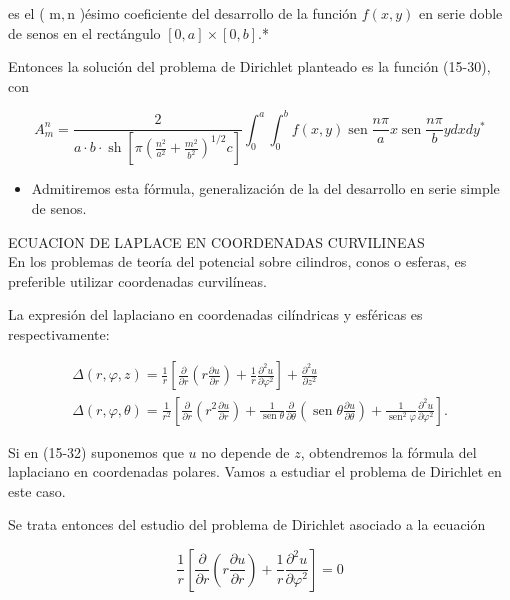 \documentclass[10pt]{article}
\theoremstyle{plain}
\theoremstyle{definition}
\theoremstyle{remark}
\begin{document}
es el ( $\mathrm{m}, \mathrm{n}$ )ésimo coeficiente del desarrollo de la función $f(x, y)$ en serie doble de senos en el rectángulo $[0, a] \times[0, b]$.*

Entonces la solución del problema de Dirichlet planteado es la función (15-30), con

$$
A_{m}^{n}=\frac{2}{a \cdot b \cdot \operatorname{sh}\left[\pi\left(\frac{n^{2}}{a^{2}}+\frac{m^{2}}{b^{2}}\right)^{1 / 2} c\right]} \int_{0}^{a} \int_{0}^{b} f(x, y) \operatorname{sen} \frac{n \pi}{a} x \operatorname{sen} \frac{n \pi}{b} y d x d y^{*}
$$

\begin{itemize}
  \item Admitiremos esta fórmula, generalización de la del desarrollo en serie simple de senos.
\end{itemize}

ECUACION DE LAPLACE EN COORDENADAS CURVILINEAS\\
En los problemas de teoría del potencial sobre cilindros, conos o esferas, es preferible utilizar coordenadas curvilíneas.

La expresión del laplaciano en coordenadas cilíndricas y esféricas es respectivamente:


\begin{gather*}
\Delta(r, \varphi, z)=\frac{1}{r}\left[\frac{\partial}{\partial r}\left(r \frac{\partial u}{\partial r}\right)+\frac{1}{r} \frac{\partial^{2} u}{\partial \varphi^{2}}\right]+\frac{\partial^{2} u}{\partial z^{2}}  \tag{15-32}\\
\Delta(r, \varphi, \theta)=\frac{1}{r^{2}}\left[\frac{\partial}{\partial r}\left(r^{2} \frac{\partial u}{\partial r}\right)+\frac{1}{\operatorname{sen} \theta} \frac{\partial}{\partial \theta}\left(\operatorname{sen} \theta \frac{\partial u}{\partial \theta}\right)+\frac{1}{\operatorname{sen}^{2} \varphi} \frac{\partial^{2} u}{\partial \varphi^{2}}\right] . \tag{15-33}
\end{gather*}


Si en (15-32) suponemos que $u$ no depende de $z$, obtendremos la fórmula del laplaciano en coordenadas polares. Vamos a estudiar el problema de Dirichlet en este caso.

Se trata entonces del estudio del problema de Dirichlet asociado a la ecuación

$$
\frac{1}{r}\left[\frac{\partial}{\partial r}\left(r \frac{\partial u}{\partial r}\right)+\frac{1}{r} \frac{\partial^{2} u}{\partial \varphi^{2}}\right]=0
$$
\end{document}
